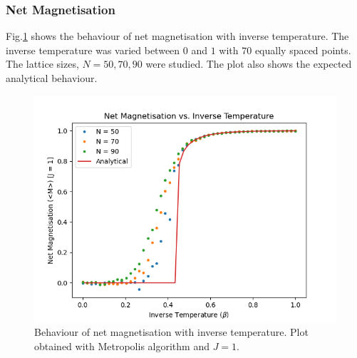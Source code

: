 \documentclass[%
reprint,
 amsmath,amssymb,
 aps,
]{revtex4-2}
\begin{document}
\subsubsection{Net Magnetisation}
Fig.\ref{fig:metromag} shows the behaviour of net magnetisation with inverse temperature. The inverse temperature was varied between $0$ and $1$ with $70$ equally spaced points. The lattice sizes, $N = 50, 70, 90$ were studied. The plot also shows the expected analytical behaviour.
\begin{figure}[h!]
    \centering
    \includegraphics[width=\columnwidth]{metro_netmag-beta.png}
    \caption{Behaviour of net magnetisation with inverse temperature. Plot obtained with Metropolis algorithm and $J=1$.}
    \label{fig:metromag}
\end{figure}
\end{document}
